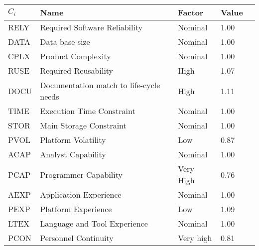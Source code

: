 \begin{table}[!htbp]
    \centering
    \begin{tabular}{| l | l | l | l | l |}
        \hline
        \textbf{$C_i$}   & \textbf{Name}                             & \textbf{Factor}   & \textbf{Value}    \\
        \hline
        RELY            & Required Software Reliability             & Nominal              & 1.00             \\
        \hline
        DATA            & Data base size                            & Nominal              & 1.00               \\
        \hline
        CPLX            & Product Complexity                        & Nominal              & 1.00              \\
        \hline
        RUSE            & Required Reusability                      & High                 & 1.07              \\
        \hline
        DOCU            & Documentation match to life-cycle needs   & High              & 1.11              \\
        \hline
        TIME            & Execution Time Constraint                 & Nominal             & 1.00              \\
        \hline
        STOR            & Main Storage Constraint                   & Nominal              & 1.00              \\
        \hline
        PVOL            & Platform Volatility                       & Low                  & 0.87              \\
        \hline
        ACAP            & Analyst Capability                        & Nominal                 & 1.00              \\
        \hline
        PCAP            & Programmer Capability                     & Very High              & 0.76             \\
        \hline
        AEXP            & Application Experience                    & Nominal             & 1.00              \\
        \hline
        PEXP            & Platform Experience                       & Low             & 1.09              \\
        \hline
        LTEX            & Language and Tool Experience              & Nominal                  & 1.00              \\
        \hline
        PCON            & Personnel Continuity                      & Very high            & 0.81              \\

\end{tabular}
\end{table}
